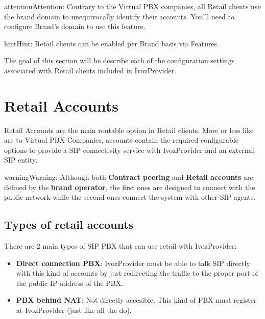 \documentclass[letterpaper,10pt,english]{sphinxmanual}
\begin{document}
\begin{notice}{attention}{Attention:}
Contrary to the Virtual PBX companies, all Retail clients use the
brand domain to unequivocally identify their accounts. You'll need to configure
Brand's domain to use this feature.
\end{notice}

\begin{notice}{hint}{Hint:}
Retail clients can be enabled per Brand basis via Features.
\end{notice}

The goal of this section will be describe each of the configuration settings
associated with Retail clients included in IvozProvider.


\section{Retail Accounts}
\label{retail/retail_accounts::doc}\label{retail/retail_accounts:retail-accounts}\label{retail/retail_accounts:id1}
Retail Accounts are the main routable option in Retail clients.
More or less like {\hyperref[pbx_features/friends:friends]{}} are to Virtual PBX Companies, accounts
contain the required configurable options to provide a SIP connectivity
service with IvozProvider and an external SIP entity.

\begin{notice}{warning}{Warning:}
Although both \textbf{Contract peering} and \textbf{Retail accounts} are defined by the
\textbf{brand operator}, the first ones are designed to connect with the public network
while the second ones connect the system with other SIP agents.
\end{notice}


\subsection{Types of retail accounts}
\label{retail/retail_accounts:types-of-retail-accounts}
There are 2 main types of SIP PBX that can use retail with IvozProvider:
\begin{itemize}
\item {} 
\textbf{Direct connection PBX}: IvozProvider must be able to talk SIP directly with
this kind of accounts by just redirecting the traffic to the proper port of
the public IP address of the PBX.

\item {} 
\textbf{PBX behind NAT}: Not directly accesible. This kind of PBX must register at
IvozProvider (just like all the {\hyperref[pbx_features/terminals:terminals]{}} do).

\end{itemize}
\end{document}
